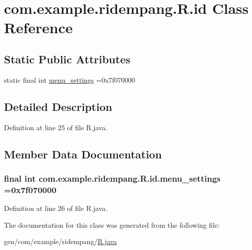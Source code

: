 \hypertarget{classcom_1_1example_1_1ridempang_1_1_r_1_1id}{\section{com.\-example.\-ridempang.\-R.\-id Class Reference}
\label{classcom_1_1example_1_1ridempang_1_1_r_1_1id}
}
\subsection*{Static Public Attributes}
\begin{DoxyCompactItemize}
\item 
static final int \hyperlink{classcom_1_1example_1_1ridempang_1_1_r_1_1id_a4ef3c2fd23113e4db9e515f12c16fc2e}{menu\-\_\-settings} =0x7f070000
\end{DoxyCompactItemize}


\subsection{Detailed Description}


Definition at line 25 of file R.\-java.



\subsection{Member Data Documentation}
\hypertarget{classcom_1_1example_1_1ridempang_1_1_r_1_1id_a4ef3c2fd23113e4db9e515f12c16fc2e}{
\subsubsection[{menu\-\_\-settings}]{\setlength{\rightskip}{0pt plus 5cm}final int com.\-example.\-ridempang.\-R.\-id.\-menu\-\_\-settings =0x7f070000\hspace{0.3cm}{\ttfamily [static]}}}\label{classcom_1_1example_1_1ridempang_1_1_r_1_1id_a4ef3c2fd23113e4db9e515f12c16fc2e}


Definition at line 26 of file R.\-java.



The documentation for this class was generated from the following file\-:\begin{DoxyCompactItemize}
\item 
gen/com/example/ridempang/\hyperlink{_r_8java}{R.\-java}\end{DoxyCompactItemize}
